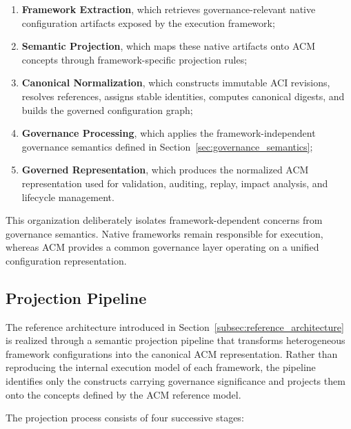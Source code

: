 \documentclass[10pt]{article}
\begin{document}
\begin{enumerate}
	\item \textbf{Framework Extraction}, which retrieves governance-relevant native configuration artifacts exposed by the execution framework;
	
	\item \textbf{Semantic Projection}, which maps these native artifacts onto ACM concepts through framework-specific projection rules;
	
	\item \textbf{Canonical Normalization}, which constructs immutable ACI revisions, resolves references, assigns stable identities, computes canonical digests, and builds the governed configuration graph;
	
	\item \textbf{Governance Processing}, which applies the framework-independent governance semantics defined in Section~\ref{sec:governance_semantics};
	
	\item \textbf{Governed Representation}, which produces the normalized ACM representation used for validation, auditing, replay, impact analysis, and lifecycle management.
\end{enumerate}

This organization deliberately isolates framework-dependent concerns from governance semantics. Native frameworks remain responsible for execution, whereas ACM provides a common governance layer operating on a unified configuration representation.







\subsection{Projection Pipeline}
\label{subsec:semantic_projection_pipeline}

The reference architecture introduced in Section~\ref{subsec:reference_architecture} is realized through a semantic projection pipeline that transforms heterogeneous framework configurations into the canonical ACM representation. Rather than reproducing the internal execution model of each framework, the pipeline identifies only the constructs carrying governance significance and projects them onto the concepts defined by the ACM reference model.

The projection process consists of four successive stages:
\end{document}
